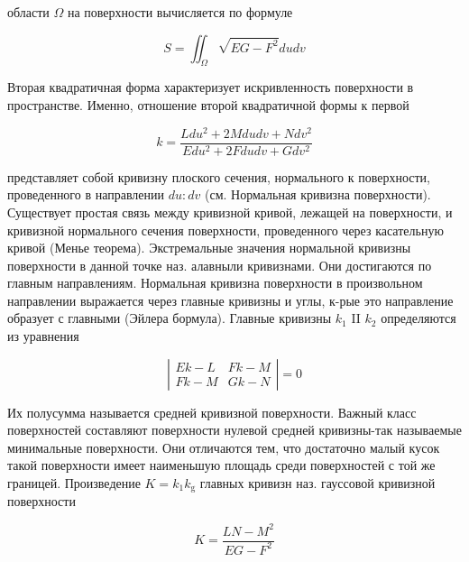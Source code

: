 \documentclass[10pt]{article}
\begin{document}
области $\Omega$ на поверхности вычисляется по формуле



\[

S=\iint_{\Omega} \sqrt{E G-F^{2}} d u d v

\]



Вторая квадратичная форма характеризует искривленность поверхности в пространстве. Именно, отношение второй квадратичной формы к первой



\[

k=\frac{L d u^{2}+2 M d u d v+N d v^{2}}{E d u^{2}+2 F d u d v+G d v^{2}}

\]



представляет собой кривизну плоского сечения, нормального к поверхности, проведенного в направлении $d u: d v$ (см. Нормальная кривизна поверхности). Существует простая связь между кривизной кривой, лежащей на поверхности, и кривизной нормального сечения поверхности, проведенного через касательную кривой (Менье теорема). Экстремальные значения нормальной кривизны поверхности в данной точке наз. алавныли кривизнами. Они достигаются по главным направлениям. Нормальная кривизна поверхности в произвольном направлении выражается через главные кривизны и углы, к-рые это направление образует с главными (Эйлера бормула). Главные кривизны $k_{1}$ II $k_{2}$ определяются из уравнения



\[

\left|\begin{array}{ll}

E k-L & F k-M \\

F k-M & G k-N

\end{array}\right|=0

\]



Их полусумма называется средней кривизной поверхности. Важный класс поверхностей составляют поверхности нулевой средней кривизны-так называемые минимальные поверхности. Они отличаются тем, что достаточно малый кусок такой поверхности имеет наименьшую площадь среди поверхностей с той же границей. Произведение $K=k_{1} k_{\mathrm{g}}$ главных кривизн наз. гауссовой кривизной поверхности



\[

K=\frac{L N-M^{2}}{E G-F^{2}}

\]
\end{document}

